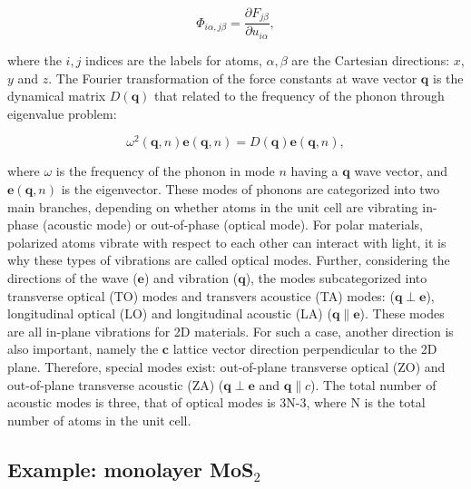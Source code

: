 \begin{equation}
\Phi_{i\alpha,j\beta}= \frac{\partial F_{j\beta}}{\partial u_{i\alpha}},
\end{equation} 

where the $i,j$ indices are the labels for atoms, $\alpha,\beta$ are the Cartesian directions: $x$, $y$ and $z$. The Fourier transformation of the force constants at wave vector $\mathbf{q}$ is the dynamical matrix $D(\mathbf{q})$ that related to the frequency of the phonon through eigenvalue problem:

\begin{equation}\label{eqa:w_q}
\omega^2(\mathbf{q},n)\mathbf{e}(\mathbf{q},n)=D(\mathbf{q})\mathbf{e}(\mathbf{q},n),
\end{equation}

where $\omega$ is the frequency of the phonon in mode $n$ having a $\mathbf{q}$ wave vector, and $\mathbf{e}(\mathbf{q},n)$ is the eigenvector\cite{Ackland1997,Parlinski2011}.  These modes of phonons are categorized into two main branches, depending on whether atoms in the unit cell are vibrating in-phase (acoustic mode) or out-of-phase (optical mode). For polar materials, polarized atoms vibrate with respect to each other can interact with light, it is why these types of vibrations are called optical modes. Further, considering the directions of the wave ($\mathbf{e}$) and vibration ($\mathbf{q}$), the modes subcategorized into transverse optical (TO) modes and transvers acoustice (TA) modes: ($\mathbf{q} \perp \mathbf{e}$), longitudinal optical (LO) and longitudinal acoustic (LA) ($\mathbf{q} \parallel \mathbf{e}$). These modes are all in-plane vibrations for 2D materials. For such a case, another direction is also important, namely the $\mathbf{c}$ lattice vector direction perpendicular to the 2D plane. Therefore, special modes exist: out-of-plane transverse optical (ZO) and out-of-plane transverse acoustic (ZA) ($\mathbf{q} \perp \mathbf{e}$ and $\mathbf{q} \parallel c$). The total number of acoustic modes is three, that of optical modes is 3N-3, where N is the total number of atoms in the unit cell. 


\subsection{Example: monolayer MoS$_2$}

